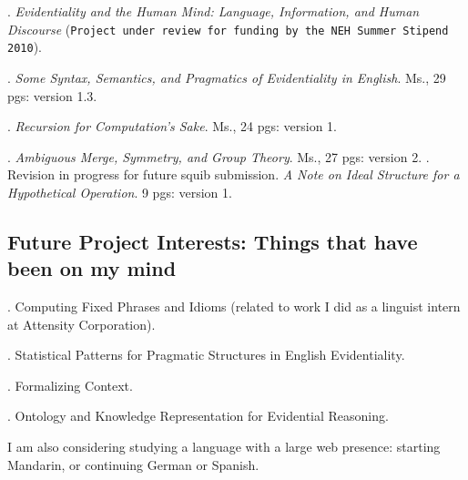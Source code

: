 \documentclass[11pt]{article}
\begin{document}
\ex. \textsl{Evidentiality and the Human Mind: Language, Information, and Human Discourse} (\texttt{Project under review for funding by the NEH Summer Stipend 2010}). 

\ex. \textsl{Some Syntax, Semantics, and Pragmatics of Evidentiality in English}. Ms., 29 pgs: version 1.3. 

\ex. \textsl{Recursion for Computation's Sake}. Ms., 24 pgs: version 1.

\ex. \textsl{Ambiguous Merge, Symmetry, and Group Theory}. Ms., 27 pgs: version 2. 
\a.  \small{Revision in progress for future squib submission. \textsl{A Note on Ideal Structure for a Hypothetical Operation}. 9 pgs: version 1}.

\subsection{Future Project Interests: Things that have been on my mind}
\ex. Computing Fixed Phrases and Idioms (\small{related to work I did as a linguist intern at Attensity Corporation}).

\ex. Statistical Patterns for Pragmatic Structures in English Evidentiality. 

\ex. Formalizing Context.

\ex. Ontology and Knowledge Representation for Evidential Reasoning.

I am also considering studying a language with a large web presence: starting Mandarin, or continuing German or Spanish.  
\end{document}
